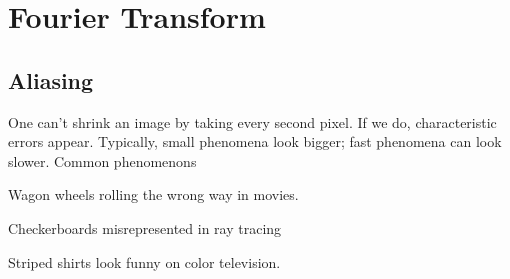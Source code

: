 \chapter{Fourier Transform}
\section{Aliasing}
One can't shrink an image by taking every second pixel. If we do, characteristic errors appear. Typically, small phenomena look bigger; fast phenomena can look slower. Common phenomenons
\begin{inparaenum}[\itshape(1)]
	\item Wagon wheels rolling the wrong way in movies.
	\item Checkerboards misrepresented in ray tracing
	\item Striped shirts look funny on color television.
\end{inparaenum}
